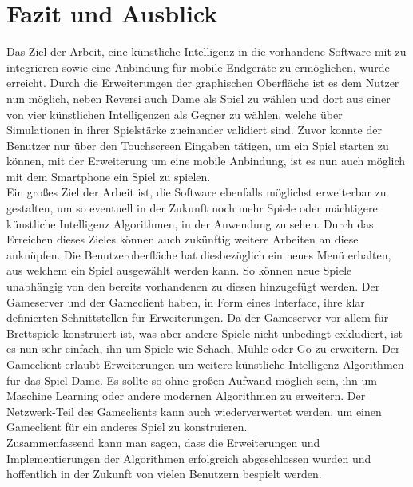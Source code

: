 \documentclass[12pt,a4paper,bibliography=totocnumbered,listof=totocnumbered]{article}
\begin{document}
\pagebreak
\section{Fazit und Ausblick}
Das Ziel der Arbeit, eine künstliche Intelligenz in die vorhandene Software mit zu integrieren sowie eine Anbindung für mobile Endgeräte zu ermöglichen, wurde erreicht.
Durch die Erweiterungen der graphischen Oberfläche ist es dem Nutzer nun möglich, neben Reversi auch Dame als Spiel zu wählen und dort aus einer 
von vier künstlichen Intelligenzen als Gegner zu wählen, welche über Simulationen in ihrer Spielstärke zueinander validiert sind. 
Zuvor konnte der Benutzer nur über den Touchscreen Eingaben tätigen, um ein Spiel starten zu können,
mit der Erweiterung um eine mobile Anbindung, ist es nun auch möglich mit dem Smartphone ein Spiel zu spielen. 
\\
Ein großes Ziel der Arbeit ist, die Software ebenfalls möglichst erweiterbar zu gestalten, um so eventuell in der Zukunft noch mehr Spiele oder 
mächtigere künstliche Intelligenz Algorithmen, in der Anwendung zu sehen. Durch das Erreichen dieses Zieles können auch zukünftig weitere 
Arbeiten an diese anknüpfen.
Die Benutzeroberfläche hat diesbezüglich ein neues Menü erhalten, aus welchem ein Spiel ausgewählt werden kann. 
So können neue Spiele unabhängig von den bereits vorhandenen zu diesen hinzugefügt werden.
Der Gameserver und der Gameclient haben, in Form eines Interface, ihre klar definierten Schnittstellen für Erweiterungen. 
Da der Gameserver vor allem für Brettspiele konstruiert ist, was aber 
andere Spiele nicht unbedingt exkludiert, ist es nun sehr einfach, ihn um Spiele wie Schach, Mühle oder Go zu erweitern. 
Der Gameclient erlaubt Erweiterungen um weitere künstliche Intelligenz Algorithmen für das Spiel Dame. Es sollte so ohne großen Aufwand möglich sein, 
ihn um Maschine Learning oder andere modernen Algorithmen zu erweitern. Der Netzwerk-Teil des Gameclients kann auch wiederverwertet werden,
um einen Gameclient für ein anderes Spiel zu konstruieren. 
\\
Zusammenfassend kann man sagen, dass die Erweiterungen und Implementierungen der Algorithmen erfolgreich abgeschlossen wurden und hoffentlich 
in der Zukunft von vielen Benutzern bespielt werden.

\pagebreak
\end{document}

